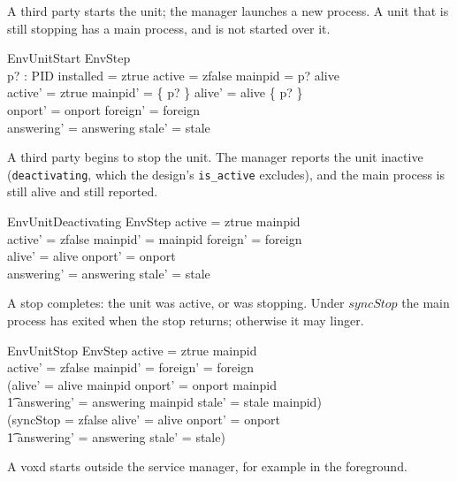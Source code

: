 \documentclass[a4paper,10pt,fleqn]{article}
\begin{document}
A third party starts the unit; the manager launches a new process. A unit
that is still stopping has a main process, and is not started over it.

\begin{schema}{EnvUnitStart}
  EnvStep \\
  p? : PID
\where
  installed = ztrue \land active = zfalse \land mainpid = \emptyset \land
    p? \notin alive \\
  active' = ztrue \land mainpid' = \{ p? \} \land
    alive' = alive \cup \{ p? \} \\
  onport' = onport \land foreign' = foreign \\
  answering' = answering \land stale' = stale
\end{schema}

A third party begins to stop the unit. The manager reports the unit
inactive (\texttt{deactivating}, which the design's \texttt{is\_active}
excludes), and the main process is still alive and still reported.

\begin{schema}{EnvUnitDeactivating}
  EnvStep
\where
  active = ztrue \land mainpid \neq \emptyset \\
  active' = zfalse \land mainpid' = mainpid \land foreign' = foreign \\
  alive' = alive \land onport' = onport \\
  answering' = answering \land stale' = stale
\end{schema}

A stop completes: the unit was active, or was stopping. Under $syncStop$ the
main process has exited when the stop returns; otherwise it may linger.

\begin{schema}{EnvUnitStop}
  EnvStep
\where
  active = ztrue \lor mainpid \neq \emptyset \\
  active' = zfalse \land mainpid' = \emptyset \land foreign' = foreign \\
  (alive' = alive \setminus mainpid \land onport' = onport \setminus mainpid
    \land \\
  \t1 answering' = answering \setminus mainpid \land
    stale' = stale \setminus mainpid) \lor \\
  (syncStop = zfalse \land alive' = alive \land onport' = onport \land \\
  \t1 answering' = answering \land stale' = stale)
\end{schema}

A voxd starts outside the service manager, for example in the foreground.
\end{document}
